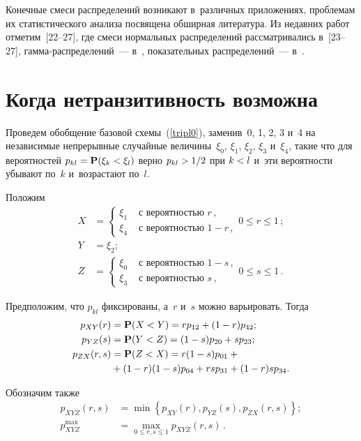 \begin{multicols}{2}
Конечные смеси распределений возникают в~различных приложениях, проблемам 
их статистического
анализа посвящена обширная литература. Из недавних работ отметим~[22--27],
где смеси нормальных распределений рассматривались в~[23--27],
гам\-ма-рас\-пре\-де\-ле\-ний~--- в~\cite{Bat, Ben, Gorsh2}, показательных распределений~---
 в~\cite{Bat}.

\section{Когда нетранзитивность возможна}

Проведем обобщение базовой схемы~(\ref{tripl0}), заменив~0, 1, 2, 3 и~4 на независимые 
непрерывные
случайные величины~$\xi_0$, $\xi_1$, $\xi_2$, $\xi_3$ и~$\xi_4$, такие что
для вероятностей $p_{kl}\hm={\bf P}(\xi_k\hm<\xi_l)$ верно $p_{kl}\hm>1/2$ при 
$k\hm<l$ и~эти вероятности убывают по~$k$ и~возрастают по~$l$.

Положим
\begin{align*}
X&=\left\{\begin{array}{ll}
\xi_1 & \mbox{ с~вероятностью } r\,,\\
\xi_4 & \mbox{ с~вероятностью } 1-r\,,
\end{array}\right. 0\le r\le 1\,;\\
Y&=\xi_2;\\
Z&=\left\{\begin{array}{ll}
\xi_0 & \mbox{ с~вероятностью } 1-s\,,\\
\xi_3 & \mbox{ с~вероятностью } s\,,
\end{array}\right. 0\le s\le 1\,.
\end{align*}

Предположим, что $p_{kl}$ фиксированы, а~$r$ и~$s$ можно варьировать. Тогда
\begin{align*}
p_{XY}(r)&={\bf P}(X<Y)=rp_{12}+(1-r)p_{42};\\ 
p_{YZ}(s)&={\bf P}(Y<Z)=(1-s)p_{20}+sp_{23};\\
p_{ZX}(r,s)&={\bf P}(Z<X)=r(1-s)p_{01}+{}\\
&{}+(1-r)(1-s)p_{04}+rsp_{31}+(1-r)sp_{34}.
\end{align*}

Обозначим также
\begin{align*}
p_{XYZ}(r,s)&=\min\left\{p_{XY}(r),p_{YZ}(s),p_{ZX}(r,s)\right\};\\
p_{XYZ}^{\max}&=\max\limits_{0\le r,s\le 1}p_{XYZ}(r,s)\,.
\end{align*}


\end{multicols}
